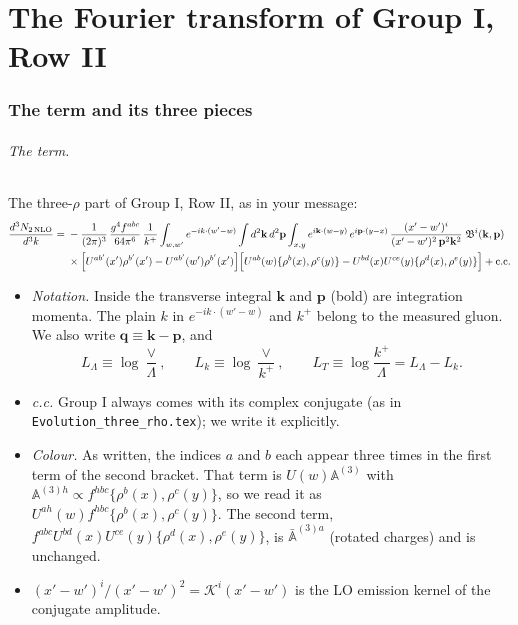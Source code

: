 \documentclass[10pt]{article}
\numberwithin{equation}{section}
\newcommand{\KK}{\mathcal K}
\newcommand{\bk}{\mathbf k}
\newcommand{\bp}{\mathbf p}
\newcommand{\bq}{\mathbf q}
\begin{document}
\part{The Fourier transform of Group I, Row II}\label{part:ft}
\section{The term and its three pieces}\label{sec:ft-input}

\paragraph{The term.} The three-$\rho$ part of Group I, Row II, as in your message:
\begin{align}
\frac{d^3N_{2\,\rm NLO}}{d^3k}={}&-\frac{1}{(2\pi)^3}\,\frac{g^4f^{abc}}{64\pi^6}\,\frac{1}{k^+}\int_{w,w'}e^{-ik\cdot(w'-w)}\int d^2\bk\,d^2\bp\int_{x,y}e^{i\bk\cdot(w-y)}\,e^{i\bp\cdot(y-x)}\,\frac{(x'-w')^i}{(x'-w')^2\,\bp^2\bk^2}\;\mathfrak B^i(\bk,\bp)\notag\\
&\times\Big[U^{ab'}(x')\rho^{b'}(x')-U^{ab'}(w')\rho^{b'}(x')\Big]\Big[U^{ab}(w)\{\rho^b(x),\rho^c(y)\}-U^{bd}(x)U^{ce}(y)\{\rho^d(x),\rho^e(y)\}\Big]+{\rm c.c.}
\label{eq:ft-term}
\end{align}
\begin{itemize}
\item \emph{Notation.} Inside the transverse integral $\bk$ and $\bp$ (bold) are integration momenta. The plain $k$ in $e^{-ik\cdot(w'-w)}$ and $k^+$ belong to the measured gluon. We also write $\bq\equiv\bk-\bp$, and
\begin{equation}
L_\Lambda\equiv\log\frac{\vee}{\Lambda},\qquad L_k\equiv\log\frac{\vee}{k^+},\qquad L_T\equiv\log\frac{k^+}{\Lambda}=L_\Lambda-L_k .
\end{equation}
\item \emph{c.c.} Group I always comes with its complex conjugate (as in \texttt{Evolution\_three\_rho.tex}); we write it explicitly.
\item \emph{Colour.} As written, the indices $a$ and $b$ each appear three times in the first term of the second bracket. That term is $U(w)\mathbb A^{(3)}$ with $\mathbb A^{(3)h}\propto f^{hbc}\{\rho^b(x),\rho^c(y)\}$, so we read it as $U^{ah}(w)f^{hbc}\{\rho^b(x),\rho^c(y)\}$. The second term, $f^{abc}U^{bd}(x)U^{ce}(y)\{\rho^d(x),\rho^e(y)\}$, is $\bar{\mathbb A}^{(3)a}$ (rotated charges) and is unchanged.
\item $(x'-w')^i/(x'-w')^2=\KK^i(x'-w')$ is the LO emission kernel of the conjugate amplitude.
\end{itemize}
\end{document}
